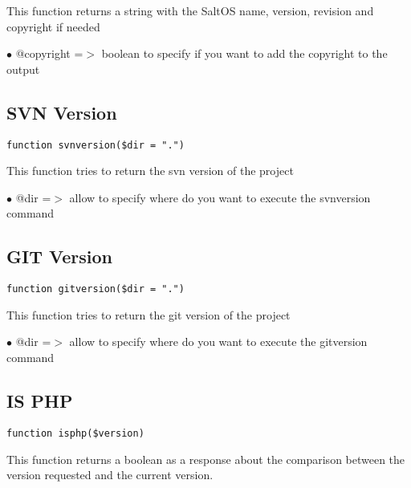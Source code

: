 \documentclass[a4paper]{book}
\begin{document}
This function returns a string with the SaltOS name, version, revision and
copyright if needed

\begin{compactitem}
\item[\color{myblue}$\bullet$] @copyright =$>$ boolean to specify if you want to add the copyright to the output
\end{compactitem}

\hypertarget{toc313}{}
\subsection{SVN Version}

\begin{lstlisting}
function svnversion($dir = ".")
\end{lstlisting}

This function tries to return the svn version of the project

\begin{compactitem}
\item[\color{myblue}$\bullet$] @dir =$>$ allow to specify where do you want to execute the svnversion command
\end{compactitem}

\hypertarget{toc314}{}
\subsection{GIT Version}

\begin{lstlisting}
function gitversion($dir = ".")
\end{lstlisting}

This function tries to return the git version of the project

\begin{compactitem}
\item[\color{myblue}$\bullet$] @dir =$>$ allow to specify where do you want to execute the gitversion command
\end{compactitem}

\hypertarget{toc315}{}
\subsection{IS PHP}

\begin{lstlisting}
function isphp($version)
\end{lstlisting}

This function returns a boolean as a response about the comparison between the
version requested and the current version.
\end{document}
